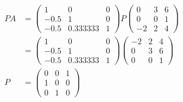 \documentclass[pdf]{beamer}
\begin{document}
\begin{frame}{}\begin{align*}PA&=\begin{pmatrix}1&0&0\\-0.5&1&0\\-0.5&0.333333&1\end{pmatrix} P \begin{pmatrix}0&3&6\\0&0&1\\-2&2&4\end{pmatrix}\\&= \begin{pmatrix}1&0&0\\-0.5&1&0\\-0.5&0.333333&1\end{pmatrix} \begin{pmatrix}-2&2&4\\0&3&6\\0&0&1\end{pmatrix} \\ P&= \begin{pmatrix}0&0&1\\1&0&0\\0&1&0\end{pmatrix}\end{align*}
\end{frame}
\end{document}
